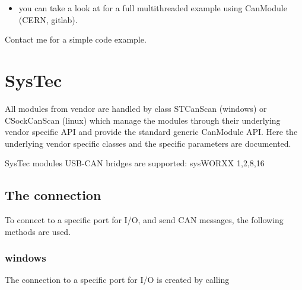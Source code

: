 \documentclass[letterpaper,10pt,english]{sphinxmanual}
\begin{document}
\begin{sphinxVerbatim}[commandchars=\\\{\}]
 
    
        
     
\end{sphinxVerbatim}
\begin{itemize}
\item {} 
you can take a look at  for a full multithreaded example using CanModule (CERN, gitlab).

\end{itemize}

Contact me for a simple code example.


\chapter{SysTec}
\label{\detokenize{vendors/systec:systec}}\label{\detokenize{vendors/systec::doc}}
All modules from vendor {\hyperref[\detokenize{vendors/systec:systec}]{}} are handled by class STCanScan (windows) or CSockCanScan (linux) which
manage the modules through their underlying vendor specific API and provide the standard generic CanModule API.
Here the underlying vendor specific classes and the specific parameters are documented.

SysTec modules USB-CAN bridges are supported: sysWORXX 1,2,8,16


\section{The connection}
\label{\detokenize{vendors/systec:the-connection}}
To connect to a specific port for I/O, and send CAN messages, the following methods are used.


\subsection{windows}
\label{\detokenize{vendors/systec:windows}}
The connection to a specific port for I/O is created by calling
\end{document}
